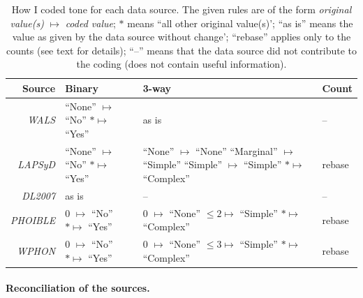 \documentclass[twoside,onecolumn]{article}
\begin{document}
\begin{table}[h]
  \caption{How I coded tone for each data source. The given rules are of the form \textit{original value(s)}  $\mapsto$ \textit{coded value}; $\ast$ means ``all other original value(s)'; ``as is'' means the value as given by the data source without change'; ``rebase'' applies only to the counts (see text for details); ``--'' means that the data source did not contribute to the coding (does not contain useful information).}
  \label{Tab:tone_coding_rules}
  \centering
  \begin{tabularx}{\textwidth}{|r|X|X|X|}
    \toprule
    \textbf{Source} & \textbf{Binary} & \textbf{3-way} & \textbf{Count} \\
    \midrule
    \textit{WALS} & \makecell[l]{``None'' $\mapsto$ ``No''\\ $\ast \mapsto$ ``Yes''} & as is & -- \\
    \midrule
    \textit{LAPSyD} & \makecell[l]{``None'' $\mapsto$ ``No''\\ $\ast \mapsto$ ``Yes''} & \makecell[l]{``None'' $\mapsto$ ``None''\\``Marginal'' $\mapsto$ ``Simple''\\``Simple'' $\mapsto$ ``Simple''\\ $\ast \mapsto$ ``Complex''} & rebase \\
    \midrule
    \textit{DL2007} & as is & -- & -- \\
    \midrule
    \textit{PHOIBLE} & \makecell[l]{0 $\mapsto$ ``No''\\ $\ast \mapsto$ ``Yes''} & \makecell[l]{0 $\mapsto$ ``None''\\ $\leq 2 \mapsto$ ``Simple''\\ $\ast \mapsto$ ``Complex''} & rebase \\
    \midrule
    \textit{WPHON} & \makecell[l]{0 $\mapsto$ ``No''\\ $\ast \mapsto$ ``Yes''} & \makecell[l]{0 $\mapsto$ ``None''\\ $\leq 3 \mapsto$ ``Simple''\\ $\ast \mapsto$ ``Complex''} & rebase \\
    \bottomrule
  \end{tabularx}
\end{table}

\paragraph{Reconciliation of the sources.}
\end{document}
